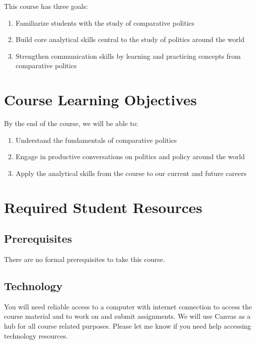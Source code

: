 \documentclass[
  11pt,
]{article}
\begin{document}
This course has three goals:

\begin{enumerate}
\def\labelenumi{\arabic{enumi}.}
\item
  Familiarize students with the study of comparative politics
\item
  Build core analytical skills central to the study of politics around
  the world
\item
  Strengthen communication skills by learning and practicing concepts
  from comparative politics
\end{enumerate}

\hypertarget{course-learning-objectives}{%
\section{Course Learning Objectives}\label{course-learning-objectives}}

By the end of the course, we will be able to:

\begin{enumerate}
\def\labelenumi{\arabic{enumi}.}
\item
  Understand the fundamentals of comparative politics
\item
  Engage in productive conversations on politics and policy around the
  world
\item
  Apply the analytical skills from the course to our current and future
  careers
\end{enumerate}

\hypertarget{required-student-resources}{%
\section{Required Student Resources}\label{required-student-resources}}

\hypertarget{prerequisites}{%
\subsection{Prerequisites}\label{prerequisites}}

There are no formal prerequisites to take this course.

\hypertarget{technology}{%
\subsection{Technology}\label{technology}}

You will need reliable access to a computer with internet connection to
access the course material and to work on and submit assignments. We
will use Canvas as a hub for all course related purposes. Please let me
know if you need help accessing technology resources.
\end{document}
